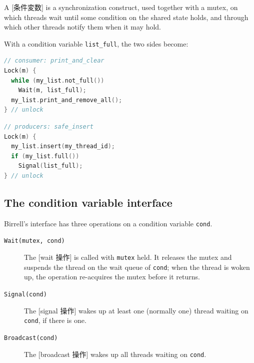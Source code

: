 \documentclass[../main.tex]{subfiles}
\begin{document}
\begin{definition}
  A [条件変数] is a synchronization construct,
  used together with a mutex, on which threads wait until some condition on
  the shared state holds, and through which other threads notify them when
  it may hold.
\end{definition}

With a condition variable \texttt{list\_full}, the two sides become:
\begin{lstlisting}[language=C, numbers=none]
// consumer: print_and_clear
Lock(m) {
  while (my_list.not_full())
    Wait(m, list_full);
  my_list.print_and_remove_all();
} // unlock
\end{lstlisting}
\begin{lstlisting}[language=C, numbers=none]
// producers: safe_insert
Lock(m) {
  my_list.insert(my_thread_id);
  if (my_list.full())
    Signal(list_full);
} // unlock
\end{lstlisting}

\subsection{The condition variable interface}

Birrell's interface has three operations on a condition variable
\texttt{cond}.
\begin{description}
  \item[\texttt{Wait(mutex, cond)}] The [wait 操作] is
    called with \texttt{mutex} held.  It releases the mutex and suspends the
    thread on the wait queue of \texttt{cond}; when the thread is woken up,
    the operation re-acquires the mutex before it returns.
  \item[\texttt{Signal(cond)}] The [signal 操作] wakes
    up at least one (normally one) thread waiting on \texttt{cond}, if
    there is one.
  \item[\texttt{Broadcast(cond)}] The
    [broadcast 操作] wakes up all threads waiting
    on \texttt{cond}.
\end{description}
\end{document}
